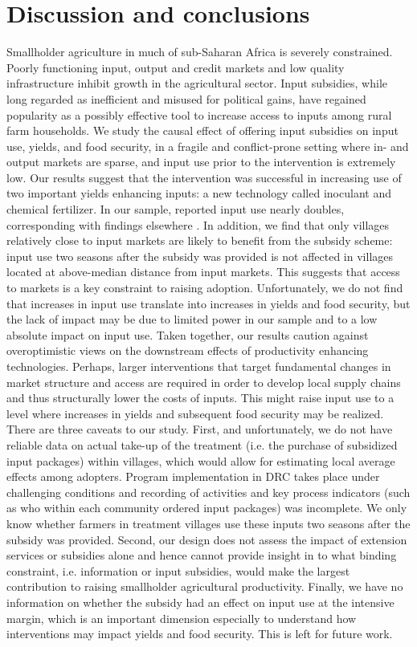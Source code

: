 \section{Discussion and conclusions} 
Smallholder agriculture in much of sub-Saharan Africa is severely constrained. Poorly functioning input, output and credit markets and low quality infrastructure inhibit growth in the agricultural sector. Input subsidies, while long regarded as inefficient and misused for political gains, have regained popularity as a possibly effective tool to increase access to inputs among rural farm households. We study the causal effect of offering input subsidies on input use, yields, and food security, in a fragile and conflict-prone setting where in- and output markets are sparse, and input use prior to the intervention is extremely low. 
Our results suggest that the intervention was successful in increasing use of two important yields enhancing inputs: a new technology called inoculant and chemical fertilizer. In our sample, reported input use nearly doubles, corresponding with findings elsewhere \citep{Carter2014,Brune2016}. In addition, we find that only villages relatively close to input markets are likely to benefit from the subsidy scheme: input use two seasons after the subsidy was provided is not affected in villages located at above-median distance from input markets. This suggests that access to markets is a key constraint to raising adoption. Unfortunately, we do not find that increases in input use translate into increases in yields and food security, but the lack of impact may be due to limited power in our sample and to a low absolute impact on input use. Taken together, our results caution against overoptimistic views on the downstream effects of productivity enhancing technologies. Perhaps, larger interventions that target fundamental changes in market structure and access are required in order to develop local supply chains and thus structurally lower the costs of inputs. This might raise input use to a level where increases in yields and subsequent food security may be realized. 
There are three caveats to our study. First, and unfortunately, we do not have reliable data on actual take-up of the treatment (i.e. the purchase of subsidized input packages) within villages, which would allow for estimating local average effects among adopters. Program implementation in DRC takes place under challenging conditions and recording of activities and key process indicators (such as who within each community ordered input packages) was incomplete. We only know whether farmers in treatment villages use these inputs two seasons after the subsidy was provided. Second, our design does not assess the impact of extension services or subsidies alone and hence cannot provide insight in to what binding constraint, i.e. information or input subsidies, would make the largest contribution to raising smallholder agricultural productivity. Finally, we have no information on whether the subsidy had an effect on input use at the intensive margin, which is an important dimension especially to understand how interventions may impact yields and food security. This is left for future work. 


